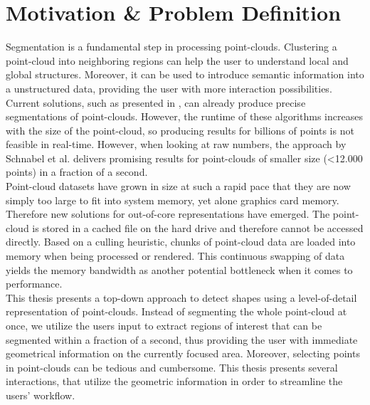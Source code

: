 \section{Motivation \& Problem Definition}
Segmentation is a fundamental step in processing point-clouds. Clustering a point-cloud into neighboring regions can help the user to understand local and global structures. Moreover, it can be used to introduce semantic information into a unstructured data, providing the user with more interaction possibilities. Current solutions, such as presented in \cite{schnabel-2007-efficient}, \cite{schnabel-2007-ransac} can already produce precise segmentations of point-clouds. However, the runtime of these algorithms increases with the size of the point-cloud, so producing results for billions of points is not feasible in real-time. However, when looking at raw numbers, the approach by Schnabel et al. \cite{schnabel-2007-ransac} delivers promising results for point-clouds of smaller size (\textless 12.000 points) in a fraction of a second. 
\\
Point-cloud datasets have grown in size at such a rapid pace that they are now simply too large to fit into system memory, yet alone graphics card memory. Therefore new solutions for out-of-core representations have emerged. The point-cloud is stored in a cached file on the hard drive and therefore cannot be accessed directly. Based on a culling heuristic, chunks of point-cloud data are loaded into memory when being processed or rendered. This continuous swapping of data yields the memory bandwidth as another potential bottleneck when it comes to performance.
\\

This thesis presents a top-down approach to detect shapes using a level-of-detail representation of point-clouds. Instead of segmenting the whole point-cloud at once, we utilize the users input to extract regions of interest that can be segmented within a fraction of a second, thus providing the user with immediate geometrical information on the currently focused area. Moreover, selecting points in point-clouds can be tedious and cumbersome. This thesis presents several interactions, that utilize the geometric information in order to streamline the users' workflow. 